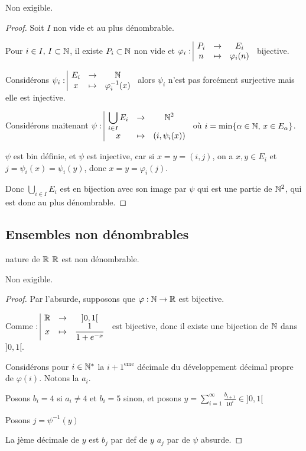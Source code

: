 Non exigible. 

\begin{proof}
    Soit $I$ non vide et au plus dénombrable.
    
    Pour $i \in I, \, I \subset \mathbb{N}$, il existe $P_i \subset \mathbb{N}$ non vide et $\varphi_i: \space \begin{array}{|ccc} \displaystyle P_i & \to & \displaystyle E_i \\ \displaystyle n & \mapsto & \displaystyle \varphi_i(n)  \end{array}$ bijective. 

    Considérons $\psi_i: \space \begin{array}{|ccc} \displaystyle E_i & \to & \displaystyle \mathbb{N} \\ \displaystyle x & \mapsto & \displaystyle \varphi_i^{-1}(x) \end{array}$ alors $\psi_i$ n'est pas forcément 
    surjective mais elle est injective. 

    Considérons maitenant $\psi: \space \begin{array}{|ccc} \displaystyle \bigcup_{i \in I} E_i & \to & \displaystyle \mathbb{N}^2 \\ \displaystyle x & \mapsto & \displaystyle (i, \psi_i(x)) \end{array}$ où $i = \min \{ \alpha \in \mathbb{N}, \, x \in E_\alpha \}$.

    $\psi$ est bin définie, et $\psi$ est injective, car si $x = y = (i, j)$, 
    on a $x, y \in E_i$ et $j = \psi_i(x) = \psi_i(y)$, donc $x = y = \varphi_i(j)$.

    Donc $\displaystyle \bigcup_{i \in I} E_i$ est en bijection avec son image par $\psi$
    qui est une partie de $\mathbb{N}^2$, qui est donc au plus dénombrable.

\end{proof}

\subsection{Ensembles non dénombrables}

\begin{theoreme}{nature de $\mathbb{R}$}{}
    $\mathbb{R}$ est non dénombrable.
\end{theoreme}

Non exigible. 

\begin{proof}
    Par l'absurde, supposons que $\varphi : \mathbb{N} \to \mathbb{R}$ est bijective. 

    Comme $: \space \begin{array}{|ccc} \displaystyle \mathbb{R} & \to & \displaystyle ]0, 1[ \\ \displaystyle x & \mapsto & \displaystyle \frac 1 {1 + e^{- x}} \end{array}$ est bijective, donc 
    il existe une bijection de $\mathbb{N}$ dans $]0, 1[$.

    Considérons pour $i \in \mathbb{N}^*$ la $i + 1^{\text{eme}}$ décimale du développement décimal 
    propre de $\varphi(i)$. Notons la $a_i$. 

    Posons $b_i = 4$ si $a_i \neq 4$ et $b_i = 5$ sinon, et posons $\displaystyle y = \sum_{i = 1}^\infty \frac{b_{i + 1}}{10^i} \in ]0, 1[$ 

    Posons $j = \psi^{-1}(y)$ 
    
    La jème décimale de $y$ est $b_j$ par def de $y$ 
    $a_j$ par de $\psi$ absurde. 
\end{proof}

